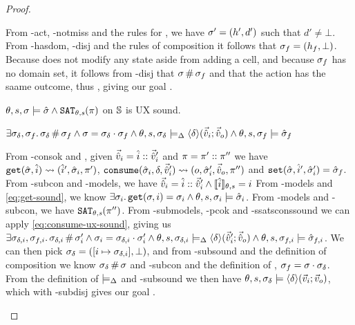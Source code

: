 \begin{proof}
\pfcase{$\alpha=\alloc$}

\begin{hypvlist}
 From \hyp{act}, \hyp{notmiss} and the rules for \alloc{}, we have $\sigma'=(h',d')$ such that $d'\neq\bot$.
 From \hyp{hasdom}, \hyp{disj} and the rules of composition it follows that $\sigma_f=(h_f,\bot)$.
 Because \alloc{} does not modify any state aside from adding a cell, and because $\sigma_f$ has no domain set, it follows from \hyp{disj} that $\sigma\operatorname{\#}\sigma_f$ and that the action has the saame outcome, thus , giving our goal .
\end{hypvlist}


\pfassume \begin{hypvlist}
 
 $\theta,s,\sigma\models \hat{\sigma} \land \texttt{SAT}_{\mathit{\theta,s}}(\pi)$
 \consume{} on $\mathbb S$ is UX sound.
\end{hypvlist}
\pfprove \begin{goalvlist}
 $\exists \sigma_\delta, \sigma_f \ldotp \sigma_\delta\operatorname{\#}\sigma_f \land \sigma=\sigma_\delta\cdot\sigma_f \land \theta, s, \sigma_\delta \models_{\Delta} \left<\delta\right>\!(\vec{\hat{v}}_i;\vec{\hat{v}}_o) \land \theta,s,\sigma_f\models \hat{\sigma}_f$
\end{goalvlist}

\pfcase{$\delta \in \preds_\mmdl$}

\begin{hypvlist}
 From \hyp{consok} and , given $\vec{\hat{v}}_i=\hat{i}::\vec{\hat{v}}_i'$ and $\pi=\pi'::\pi''$ we have $\texttt{get}(\hat{\sigma},\hat{i})\rightsquigarrow(\hat{i}', \hat{\sigma}_i, \pi')$, ${\texttt{consume}(\hat{\sigma}_i,\delta,\vec{\hat{v}}_i')\rightsquigarrow (o,\hat{\sigma}_i',\vec{\hat{v}}_o,\pi'')}$ and $\texttt{set}(\hat{\sigma},\hat{i}',\hat{\sigma}_i')=\hat{\sigma}_f$.
 From \hyp{subcon} and \hyp{models}, we have $\vec{\hat{v}}_i=\hat{i} ::\vec{\hat{v}}_i' \land \llbracket\hat{i}\rrbracket_{\theta,s}=i$
 From \hyp{models} and \ref{eq:get-sound}, we know $\exists \sigma_i\ldotp \texttt{get}(\sigma,i)=\sigma_i \land \theta,s,\sigma_i\models\hat{\sigma}_i$.
 From \hyp{models} and \hyp{subcon}, we have $\texttt{SAT}_{\mathit{\theta,s}}(\pi'')$.
 From \hyp{submodels}, \hyp{pcok} and \hyp{ssatsconssound} we can apply \ref{eq:consume-ux-sound}, giving us $\exists \sigma_{\delta,i}, \sigma_{f,i}\ldotp \sigma_{\delta,i}\operatorname{\#} \sigma_i' \land \sigma_i=\sigma_{\delta,i}\cdot\sigma_i' \land \theta,s,\sigma_{\delta,i}\models_{\Delta} \left<\delta\right>\!(\vec{\hat{v}}_i';\vec{\hat{v}}_o) \land \theta,s,\sigma_{f,i}\models\hat{\sigma}_{f,i}$.
 We can then pick $\sigma_\delta=([i\mapsto \sigma_{\delta,i}], \bot)$, and from \hyp{subsound} and the definition of composition we know $\sigma_\delta\operatorname{\#}\sigma$ and \hyp{subcon} and the definition of , $\sigma_f=\sigma\cdot\sigma_\delta$.
 From the definition of $\models_{\Delta}$ and \hyp{subsound} we then have $\theta,s,\sigma_\delta\models\left<\delta\right>\!(\vec{v}_i;\vec{v}_o)$, which with \hyp{subdisj} gives our goal .
\end{hypvlist}


\end{proof}
